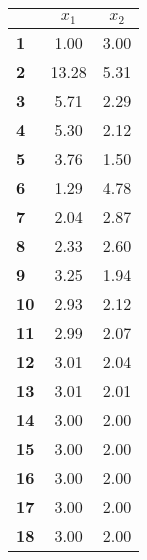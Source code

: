\begin{small}\begin{tabular}{|l|c|c|}
\hline
&\textbf{$x_1$}&\textbf{$x_2$}\\\hline
\textbf{1}&1.00&3.00\\\hline
\textbf{2}&13.28&5.31\\\hline
\textbf{3}&5.71&2.29\\\hline
\textbf{4}&5.30&2.12\\\hline
\textbf{5}&3.76&1.50\\\hline
\textbf{6}&1.29&4.78\\\hline
\textbf{7}&2.04&2.87\\\hline
\textbf{8}&2.33&2.60\\\hline
\textbf{9}&3.25&1.94\\\hline
\textbf{10}&2.93&2.12\\\hline
\textbf{11}&2.99&2.07\\\hline
\textbf{12}&3.01&2.04\\\hline
\textbf{13}&3.01&2.01\\\hline
\textbf{14}&3.00&2.00\\\hline
\textbf{15}&3.00&2.00\\\hline
\textbf{16}&3.00&2.00\\\hline
\textbf{17}&3.00&2.00\\\hline
\textbf{18}&3.00&2.00\\\hline
\end{tabular}
\end{small}